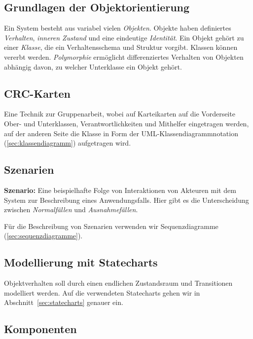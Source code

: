 \documentclass{panikzettel}
\begin{document}

\subsection{Grundlagen der Objektorientierung}

Ein System besteht aus variabel vielen \emph{Objekten}. Objekte haben definiertes \emph{Verhalten}, \emph{inneren Zustand} und eine eindeutige \emph{Identität}. Ein Objekt gehört zu einer \emph{Klasse}, die ein Verhaltensschema und Struktur vorgibt. Klassen können vererbt werden. \emph{Polymorphie} ermöglicht differenziertes Verhalten von Objekten abhängig davon, zu welcher Unterklasse ein Objekt gehört.

\subsection{CRC-Karten}

Eine Technik zur Gruppenarbeit, wobei auf Karteikarten auf die Vorderseite Ober- und Unterklassen, Verantwortlichkeiten und Mithelfer eingetragen werden, auf der anderen Seite die Klasse in Form der UML-Klassendiagrammnotation (\ref{sec:klassendiagramm}) aufgetragen wird.

\subsection{Szenarien}

\textbf{Szenario:} Eine beispielhafte Folge von Interaktionen von Akteuren mit dem System zur Beschreibung eines Anwendungsfalls.
Hier gibt es die Unterscheidung zwischen \emph{Normalfällen} und \emph{Ausnahmefällen}.

Für die Beschreibung von Szenarien verwenden wir Sequenzdiagramme (\ref{sec:sequenzdiagramme}).

\subsection{Modellierung mit Statecharts}

Objektverhalten soll durch einen endlichen Zustandsraum und Transitionen modelliert werden. Auf die verwendeten Statecharts gehen wir in Abschnitt~\ref{sec:statecharts} genauer ein.

\subsection{Komponenten}
\end{document}
